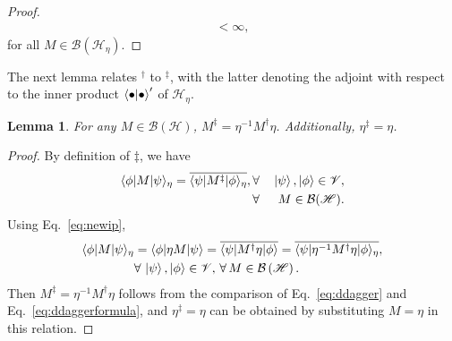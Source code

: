\documentclass[amsmath,amssymb,aps,pra,superscriptaddress,twocolumn]{revtex4-2}
\newtheorem{lemma}[theorem]{Lemma}
\begin{document}
\begin{appendix}
\begin{proof}
\begin{eqnarray}
        <\infty,
    \end{eqnarray}
     for all $M\in\mathcal{B}\left(\mathscr{H}_\eta\right) $.
\end{proof}
The next lemma relates ${}^\dagger$ to ${}^\ddagger$, with the latter denoting the adjoint with respect to the inner product $\braket{\bullet|\bullet}'$ of $\mathscr{H}_\eta$.
\begin{lemma}
For any $M \in \mathcal{B}(\mathscr{H})$, $M^\ddagger = \eta^{-1}M^\dagger \eta$. Additionally, $\eta^\ddagger = \eta$.
\end{lemma}
\begin{proof}
By definition of $\ddagger$, we have 
\begin{eqnarray}
\label{eq:ddagger}
  \langle \phi|M|\psi\rangle_\eta = \overline{\langle \psi|M^\ddagger|\phi\rangle_\eta},\,
  &\forall&\, \ket{\psi},\ket{\phi}\in \mathscr{V}, \nonumber\\
  &\forall& \, M\in \mathcal{B}(\mathscr{H}).  
\end{eqnarray}
Using Eq.~\eqref{eq:newip}, 
\begin{eqnarray}
\label{eq:ddaggerformula}
    \langle \phi|M|\psi\rangle_\eta &=  \langle \phi|\eta M|\psi\rangle = \overline{\langle\psi |M^\dagger\eta|\phi\rangle} =  
    \overline{\langle\psi |\eta^{-1}M^\dagger\eta|\phi\rangle_\eta}, \nonumber\\
    &\forall\, \ket{\psi},\ket{\phi}\in \mathscr{V}, \, \forall \, M\in \mathcal{B}\left(\mathscr{H}\right).
\end{eqnarray}
Then $M^\ddagger = \eta^{-1}M^\dagger\eta$ follows from the comparison of Eq.~\eqref{eq:ddagger} and Eq.~\eqref{eq:ddaggerformula},
and $\eta^\ddagger = \eta$ can be obtained by substituting $M=\eta$ in this relation.
\end{proof}


\end{appendix}
\end{document}
